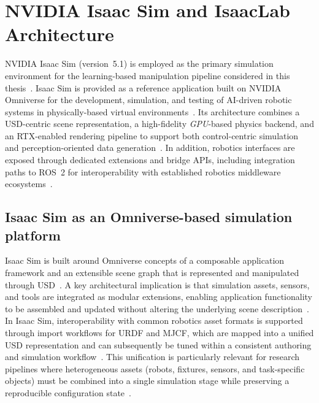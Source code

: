 
\section{NVIDIA Isaac Sim and IsaacLab Architecture}
\label{sec:isaac_sim_isaaclab_architecture}

NVIDIA Isaac Sim (version~5.1) is employed as the primary simulation environment for the learning-based manipulation pipeline considered in this thesis~\cite{isaac_sim_510_overview,isaac_sim_510_release_notes}.
Isaac Sim is provided as a reference application built on NVIDIA Omniverse for the development, simulation, and testing of AI-driven robotic systems in physically-based virtual environments~\cite{isaac_sim_510_overview}.
Its architecture combines a \ac{USD}-centric scene representation, a high-fidelity \emph{GPU}-based physics backend, and an RTX-enabled rendering pipeline to support both control-centric simulation and perception-oriented data generation~\cite{isaac_sim_510_overview}.
In addition, robotics interfaces are exposed through dedicated extensions and bridge APIs, including integration paths to \ac{ROS}~2 for interoperability with established robotics middleware ecosystems~\cite{isaac_sim_510_overview,isaac_sim_ros2_reference_architecture_510}.

\subsection{Isaac Sim as an Omniverse-based simulation platform}
Isaac Sim is built around Omniverse concepts of a composable application framework and an extensible scene graph that is represented and manipulated through \ac{USD}~\cite{isaac_sim_510_overview}.
A key architectural implication is that simulation assets, sensors, and tools are integrated as modular extensions, enabling application functionality to be assembled and updated without altering the underlying scene description~\cite{isaac_sim_510_overview}.
In Isaac Sim, interoperability with common robotics asset formats is supported through import workflows for \ac{URDF} and \ac{MJCF}, which are mapped into a unified \ac{USD} representation and can subsequently be tuned within a consistent authoring and simulation workflow~\cite{isaac_sim_510_overview}.
This unification is particularly relevant for research pipelines where heterogeneous assets (robots, fixtures, sensors, and task-specific objects) must be combined into a single simulation stage while preserving a reproducible configuration state~\cite{isaac_sim_510_overview}.

